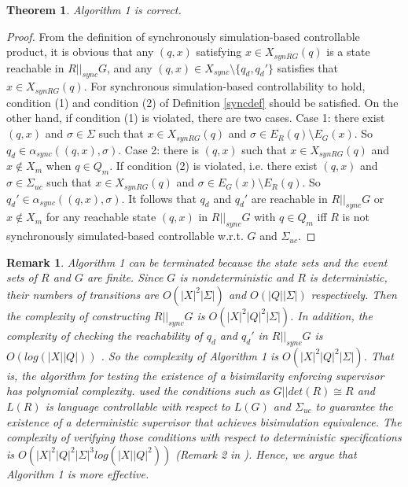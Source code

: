 \documentclass[preprint,authoryear,12pt]{elsarticle}
\newtheorem{Theorem}{Theorem}
\newtheorem{Remark}{Remark}
\begin{document}
\begin{Theorem}\label{alg1c}
Algorithm 1 is correct.
\end{Theorem}
\begin{proof}
From the definition of synchronously simulation-based controllable
product, it is obvious that any $(q, x)$ satisfying $x \in
X_{synRG}(q)$ is a state reachable in $R||_{sync}G$, and any $(q,
x) \in X_{sync}\!\setminus \!\{q_d, q_d'\}$ satisfies that $x \in
X_{synRG}(q)$. For synchronous simulation-based controllability to
hold, condition (1) and condition (2) of Definition \ref{syncdef}
should be satisfied. On the other hand, if condition (1) is
violated, there are two cases. Case 1: there exist $(q, x)$ and
$\sigma \in \Sigma$ such that $x \in X_{synRG}(q)$ and $\sigma \in
E_{R}(q) \!\setminus E_{G}(x)$. So $q_d \in \alpha_{sync}((q, x),
\sigma)$. Case 2: there is $(q, x)$ such that $x \in X_{synRG}(q)$
and $x \notin X_{m}$ when $q \in Q_{m}$. If condition (2) is
violated, i.e. there exist $(q, x)$ and $\sigma \in \Sigma_{uc}$
such that $x \in X_{synRG}(q)$ and $\sigma \in E_{G}(x)
\!\setminus E_{R}(q)$. So $q_d' \in \alpha_{sync}((q, x),
\sigma)$. It follows that $q_d$ and $q_d'$ are reachable in
$R||_{sync} G$ or $x \notin X_{m}$ for any reachable state $(q,
x)$ in $R||_{sync} G$ with $q \in Q_{m}$ iff $R$ is not
synchronously simulated-based controllable w.r.t. $G$ and
$\Sigma_{uc}$.
\end{proof}


\begin{Remark}
Algorithm 1 can be terminated because the state sets and the event
sets of $R$ and $G$ are finite. Since $G$ is nondeterministic and
$R$ is deterministic, their numbers of transitions are $O(|X|^{2}
|\Sigma|)$ and $O(|Q||\Sigma|)$ respectively. Then the complexity
of constructing $R||_{sync}G$ is $O(|X|^{2}|Q|^{2} |\Sigma|)$. In
addition, the complexity of checking the reachability of $q_d$ and
$q_d'$ in $R||_{sync}G$ is $O(log(|X||Q|))$
\citep{jones1975space}. So the complexity of Algorithm 1 is
$O(|X|^{2} |Q|^{2} |\Sigma|)$. That is, the algorithm for testing
the existence of a bisimilarity enforcing supervisor has
polynomial complexity. \cite{zhoubisimilarity2011} used the
conditions such as $G||det (R) \cong R$ and $L(R)$ is language
controllable with respect to $L(G)$ and $\Sigma_{uc}$ to guarantee
the existence of a deterministic supervisor that achieves
bisimulation equivalence. The complexity of verifying those
conditions with respect to deterministic specifications is
$O(|X|^{2}|Q|^{2}|\Sigma|^{3}log (|X||Q|^{2}))$ (Remark 2 in
\citep{zhoubisimilarity2011}). Hence, we argue that Algorithm 1 is
more effective.
\end{Remark}
\end{document}

